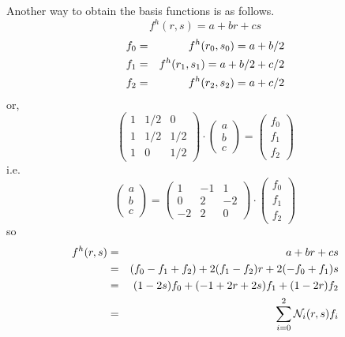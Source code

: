 Another way to obtain the basis functions is as follows.
\[
f^h(r,s)=a+br+cs
\]
\begin{eqnarray}
f_0 &=& f^h(r_0,s_0) = a +b/2 \nonumber\\
f_1 &=& f^h(r_1,s_1) = a +b/2+c/2 \nonumber\\
f_2 &=& f^h(r_2,s_2) = a +c/2 \nonumber
\end{eqnarray}
or,
\[
\left(
\begin{array}{ccc}
1 & 1/2 & 0 \\
1 & 1/2 & 1/2 \\
1 & 0 & 1/2
\end{array}
\right)
\cdot
\left(
\begin{array}{ccc}
a \\ b \\ c
\end{array}
\right)
=
\left(
\begin{array}{ccc}
f_0 \\ f_1 \\ f_2
\end{array}
\right)
\]
i.e. 
\[
\left(
\begin{array}{ccc}
a \\ b \\ c
\end{array}
\right)
=
\left(
\begin{array}{ccc}
1 & -1 & 1 \\
0 & 2 & -2 \\
-2 & 2 & 0
\end{array}
\right)
\cdot
\left(
\begin{array}{ccc}
f_0 \\ f_1 \\ f_2
\end{array}
\right)
\]
so 
\begin{eqnarray}
f^h(r,s) 
&=& a + br + cs \nonumber\\
&=& (f_0-f_1+f_2) + 2(f_1-f_2)r + 2(-f_0+f_1)s \nonumber\\
&=& (1-2s)f_0 + (-1+2r+2s)f_1 + (1-2r)f_2 \nonumber\\
&=& \sum_{i=0}^2 {\mathcal{N}}_i (r,s) f_i \nonumber
\end{eqnarray}


